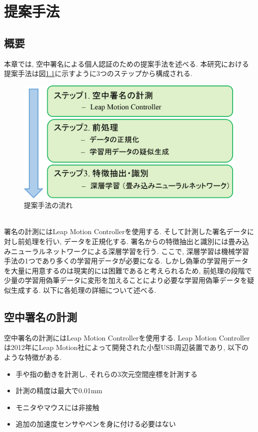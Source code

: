 \chapter{提案手法}\label{method.tex}

\section{概要}

本章では, 空中署名による個人認証のための提案手法を述べる. 本研究における提案手法は図\ref{fig:ProposedMethod}に示すように3つのステップから構成される.
\\
\begin{figure}[htbp]
  \begin{center}
    \includegraphics[clip,width=15.0cm]{./images/ProposedMethod.png}
    \caption{提案手法の流れ}
    \label{fig:ProposedMethod}
  \end{center}
\end{figure}\\

署名の計測にはLeap Motion Controllerを使用する. そして計測した署名データに対し前処理を行い, データを正規化する. 署名からの特徴抽出と識別には畳み込みニューラルネットワークによる深層学習を行う. ここで, 深層学習は機械学習手法の1つであり多くの学習用データが必要になる. しかし偽筆の学習用データを大量に用意するのは現実的には困難であると考えられるため, 前処理の段階で少量の学習用偽筆データに変形を加えることにより必要な学習用偽筆データを疑似生成する. 以下に各処理の詳細について述べる.\\

\section{空中署名の計測}

空中署名の計測にはLeap Motion Controllerを使用する. Leap Motion Controllerは2012年にLeap Motion社によって開発された小型USB周辺装置であり, 以下のような特徴がある.
\\
\begin{itemize}
  \item{手や指の動きを計測し, それらの3次元空間座標を計測する}
  \item{計測の精度は最大で0.01mm}
  \item{モニタやマウスには非接触}
  \item{追加の加速度センサやペンを身に付ける必要はない}\\
\end{itemize}

